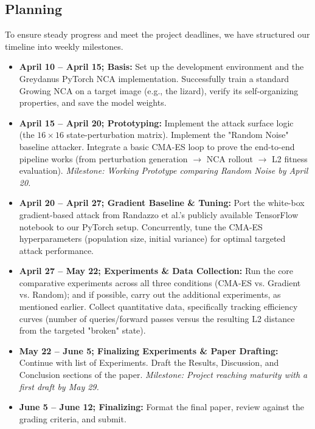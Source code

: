 \documentclass{article}
\begin{document}
\subsection*{Planning}
To ensure steady progress and meet the project deadlines, we have structured our timeline into weekly milestones.
\begin{itemize}
	\item \textbf{April 10 -- April 15; Basis:} Set up the development environment and the Greydanus PyTorch NCA implementation. 
	Successfully train a standard Growing NCA on a target image (e.g., the lizard), verify its self-organizing properties, 
	and save the model weights.
	\item \textbf{April 15 -- April 20; Prototyping:} Implement the attack surface logic (the $16 \times 16$ state-perturbation matrix). 
	Implement the "Random Noise" baseline attacker. Integrate a basic CMA-ES loop to prove the end-to-end pipeline works (from 
	perturbation generation $\rightarrow$ NCA rollout $\rightarrow$ L2 fitness evaluation). 
	\subitem \textit{Milestone: Working Prototype comparing Random Noise by April 20.}
	\item \textbf{April 20 -- April 27; Gradient Baseline \& Tuning:} Port the white-box gradient-based attack from Randazzo et al.'s publicly available TensorFlow notebook to our PyTorch setup. Concurrently, tune the CMA-ES hyperparameters (population size,
	initial variance) for optimal targeted attack performance.
	\item \textbf{April 27 -- May 22; Experiments \& Data Collection:} Run the core comparative experiments across all three conditions 
	(CMA-ES vs. Gradient vs. Random); and if possible, carry out the additional experiments, as mentioned earlier.
	Collect quantitative data, specifically tracking efficiency curves (number of queries/forward passes versus the resulting L2 distance from the targeted "broken" state).
	\item \textbf{May 22 -- June 5; Finalizing Experiments \& Paper Drafting:} Continue with list of Experiments. Draft the Results, Discussion, and Conclusion sections of the paper. 
	\subitem \textit{Milestone: Project reaching maturity with a first draft by May 29.}
	\item \textbf{June 5 -- June 12; Finalizing:} Format the final paper, review against the grading criteria, and submit.
\end{itemize}
\end{document}

